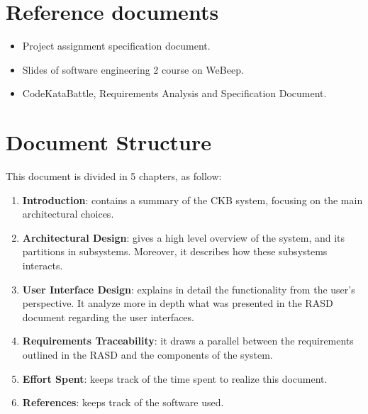\section{Reference documents}
\begin{itemize}
	\item Project assignment specification document.
	\item Slides of software engineering 2 course on WeBeep.
        \item CodeKataBattle, Requirements Analysis and Specification Document. 
\end{itemize}

\section{Document Structure}
This document is divided in 5 chapters, as follow:
\begin{enumerate}
	\item \textbf{Introduction}: contains a summary of the CKB system, focusing on the main architectural choices.

	\item \textbf{Architectural Design}: gives a high level overview of the system, and its partitions in subsystems. Moreover, it describes how these subsystems interacts.

	\item \textbf{User Interface Design}: explains in detail the functionality from the user's perspective. It analyze more in depth what was presented in the RASD document regarding the user interfaces.

	\item \textbf{Requirements Traceability}: it draws a parallel between the requirements outlined in the RASD and the components of the system.

	\item \textbf{Effort Spent}: keeps track of the time spent to realize this document.

        \item \textbf{References}: keeps track of the software used.
\end{enumerate}